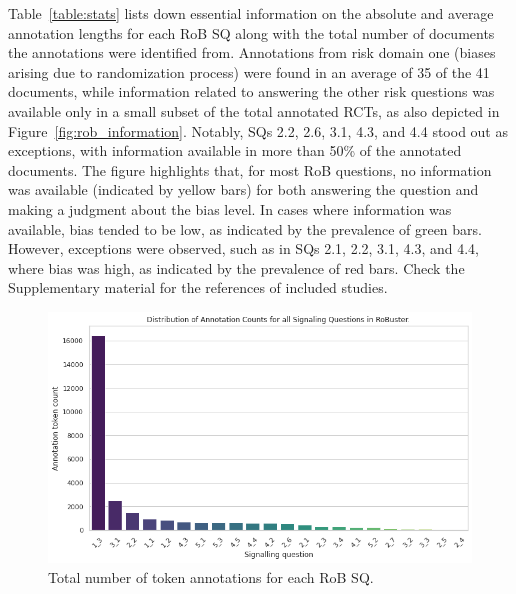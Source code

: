 \documentclass[sn-mathphys,Numbered]{sn-jnl}%
\theoremstyle{thmstyleone}%
\theoremstyle{thmstyletwo}%
\theoremstyle{thmstylethree}%
\begin{document}
Table~\ref{table:stats} lists down essential information on the absolute and average annotation lengths for each RoB SQ along with the total number of documents the annotations were identified from.
Annotations from risk domain one (biases arising due to randomization process) were found in an average of 35 of the 41 documents, while information related to answering the other risk questions was available only in a small subset of the total annotated RCTs, as also depicted in Figure~\ref{fig:rob_information}.
Notably, SQs 2.2, 2.6, 3.1, 4.3, and 4.4 stood out as exceptions, with information available in more than 50\% of the annotated documents.
The figure highlights that, for most RoB questions, no information was available (indicated by yellow bars) for both answering the question and making a judgment about the bias level. 
In cases where information was available, bias tended to be low, as indicated by the prevalence of green bars. 
However, exceptions were observed, such as in SQs 2.1, 2.2, 3.1, 4.3, and 4.4, where bias was high, as indicated by the prevalence of red bars.
Check the Supplementary material for the references of included studies.
%
%
%
\begin{figure}[htb]
    \centering
    \includegraphics[width=0.90\columnwidth]{figures/annot_counts.png}
    \caption{Total number of token annotations for each RoB SQ.}
    \label{fig:ann_counts}
\end{figure}
%
%
%
\end{document}

